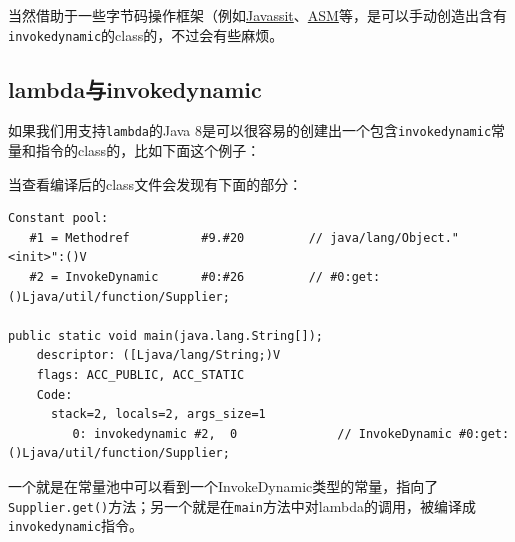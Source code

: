 \documentclass[12pt]{article}
\begin{document}
当然借助于一些字节码操作框架（例如\href{http://www.csg.is.titech.ac.jp/~chiba/javassist/}{Javassit}、\href{http://asm.ow2.org/}{ASM}等，是可以手动创造出含有\texttt{invokedynamic}的class的，不过会有些麻烦。

\subsection{lambda与invokedynamic}\label{lambdaux4e0einvokedynamic}

如果我们用支持\texttt{lambda}的Java 8是可以很容易的创建出一个包含\texttt{invokedynamic}常量和指令的class的，比如下面这个例子：

\begin{Shaded}
\begin{Highlighting}[]
 

 \OperatorTok{\{}

       \OperatorTok{(}\OperatorTok{[]}\OperatorTok{)} \OperatorTok{\{}
\OperatorTok{\textless{}}\OperatorTok{\textgreater{}}\OperatorTok{=} \OperatorTok{()} \OperatorTok{{-}\textgreater{}} \OperatorTok{;}
        \OperatorTok{(}\OperatorTok{());}
    \OperatorTok{\}}
\OperatorTok{\}}
\end{Highlighting}
\end{Shaded}

当查看编译后的class文件会发现有下面的部分：

\begin{verbatim}
Constant pool:
   #1 = Methodref          #9.#20         // java/lang/Object."<init>":()V
   #2 = InvokeDynamic      #0:#26         // #0:get:()Ljava/util/function/Supplier;

public static void main(java.lang.String[]);
    descriptor: ([Ljava/lang/String;)V
    flags: ACC_PUBLIC, ACC_STATIC
    Code:
      stack=2, locals=2, args_size=1
         0: invokedynamic #2,  0              // InvokeDynamic #0:get:()Ljava/util/function/Supplier;
\end{verbatim}

一个就是在常量池中可以看到一个InvokeDynamic类型的常量，指向了\texttt{Supplier.get()}方法；另一个就是在\texttt{main}方法中对lambda的调用，被编译成\texttt{invokedynamic}指令。
\end{document}
